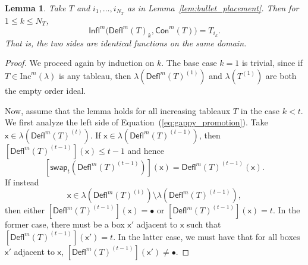 \documentclass[12pt]{amsart}
\newcommand{\x}{\ensuremath{\mathsf{x}}}
\newtheorem{lemma}[theorem]{Lemma}
\theoremstyle{definition}
\theoremstyle{remark}
\numberwithin{equation}{section}
\renewcommand{\emptyset}{\varnothing}
\newcommand{\inc}{\ensuremath{\mathrm{Inc}}}
\newcommand{\swap}{\ensuremath{\mathsf{swap}}}
\newcommand{\rep}{\ensuremath{\mathsf{Rep}}}
\newcommand{\deflate}{\ensuremath{\mathsf{Defl}}}
\newcommand{\tinflate}{\ensuremath{\mathsf{Infl}}}
\newcommand{\content}{\ensuremath{\mathsf{Con}}}
\begin{document}
\begin{lemma} \label{lem:gappy_promotion}
Take $T$ and $i_1, \ldots, i_{N_T}$ as in Lemma~\ref{lem:bullet_placement}. Then for $1 \leq k \leq N_T$, 
\begin{equation}\label{eq:gappy_promotion}
 \tinflate^m \Big( \deflate^m(T)_k, \content^m(T) \Big) = T_{i_k}. 
\end{equation}
That is, the two sides are identical functions on the same domain. 
\end{lemma}

\begin{proof}  We proceed again by induction on $k$. The base case $k=1$ is trivial, since if $T \in \inc^m(\lambda)$ is any tableau, then $\lambda \left( \deflate^m(T)^{(1)} \right)$ and $\lambda \left( T^{(1)} \right)$ are both the empty order ideal.

Now, assume that the lemma holds for all increasing tableaux $T$ in the case $k < t$. We first analyze the left side of Equation~(\ref{eq:gappy_promotion}). Take $\x \in \lambda\left( \deflate^m(T)^{(t)} \right)$. If $\x \in \lambda\left( \deflate^m(T)^{(t-1)} \right)$, then 
$[\deflate^m(T)^{(t-1)}](\x) \leq t-1$ and hence
\[
\left[ \swap_{t}(\deflate^m(T)^{(t-1)})\right](\x) = \deflate^m(T)^{(t-1)}(\x).
\]
 If instead
 \[\x \in \lambda\left(\deflate^m(T)^{(t)}\right) \setminus \lambda\left(\deflate^m(T)^{(t-1)}\right),\]
  then either $[\deflate^m(T)^{(t-1)}](\x) = \bullet$ or $[\deflate^m(T)^{(t-1)}](\x) = t$. In the former case, there must be a box $\x'$ adjacent to $\x$ such that $[\deflate^m(T)^{(t-1)}](\x') = t$. In the latter case, we must have that for all boxes $\x'$ adjacent to $\x$, $[\deflate^m(T)^{(t-1)}](\x') \neq \bullet$. 


\end{proof}
\end{document}

